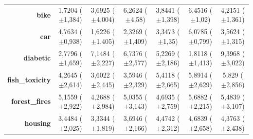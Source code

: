 \documentclass[preprint,review,12pt]{elsarticle}
\begin{document}
\begin{table}[!tb]
{\begin{tabular}{r|ccc|c|c|c|}
			\textbf{bike}                 & \cellcolor[rgb]{ .388,  .745,  .482}1,7204 ($\pm$1,384)                            & \cellcolor[rgb]{ .643,  .816,  .494}3,6925 ($\pm$4,004) & \cellcolor[rgb]{ .973,  .914,  .514}6,2624 ($\pm$4,58)  & \cellcolor[rgb]{ .663,  .824,  .498}3,8441 ($\pm$1,398) & \cellcolor[rgb]{ 1,  .922,  .518}6,4516 ($\pm$1,02)     & \cellcolor[rgb]{ .71,  .835,  .498}4,2151 ($\pm$1,361)  \\
			\textbf{car}                  & \cellcolor[rgb]{ .702,  .835,  .498}4,7634 ($\pm$0,938)                            & \cellcolor[rgb]{ .388,  .745,  .482}1,6226 ($\pm$1,405) & \cellcolor[rgb]{ .455,  .765,  .486}2,3269 ($\pm$1,409) & \cellcolor[rgb]{ .561,  .792,  .49}3,3473 ($\pm$1,35)   & \cellcolor[rgb]{ .831,  .871,  .506}6,0785 ($\pm$0,799) & \cellcolor[rgb]{ .58,  .8,  .49}3,5624 ($\pm$1,315)     \\
			\textbf{diabetic}             & \cellcolor[rgb]{ .506,  .776,  .486}2,7796 ($\pm$1,659)                            & \cellcolor[rgb]{ 1,  .886,  .514}7,1484 ($\pm$2,227)    & \cellcolor[rgb]{ 1,  .922,  .518}6,7376 ($\pm$2,577)    & \cellcolor[rgb]{ .812,  .867,  .506}5,2269 ($\pm$2,186) & \cellcolor[rgb]{ .388,  .745,  .482}1,8118 ($\pm$1,413) & \cellcolor[rgb]{ .988,  .69,  .475}9,3968 ($\pm$3,022)  \\
			\textbf{fish\_toxicity}       & \cellcolor[rgb]{ .533,  .784,  .49}4,2645 ($\pm$2,614)                             & \cellcolor[rgb]{ .388,  .745,  .482}3,6022 ($\pm$2,445) & \cellcolor[rgb]{ .388,  .745,  .482}3,5946 ($\pm$2,329) & \cellcolor[rgb]{ .784,  .859,  .502}5,4118 ($\pm$2,665) & \cellcolor[rgb]{ .89,  .89,  .51}5,8914 ($\pm$2,629)    & \cellcolor[rgb]{ .875,  .886,  .51}5,829 ($\pm$2,856)   \\
			\textbf{forest\_fires}        & \cellcolor[rgb]{ .769,  .855,  .502}5,1559 ($\pm$2,922)                            & \cellcolor[rgb]{ .388,  .745,  .482}4,2688 ($\pm$2,984) & \cellcolor[rgb]{ .718,  .839,  .498}5,0355 ($\pm$3,143) & \cellcolor[rgb]{ .569,  .796,  .49}4,6935 ($\pm$2,759)  & \cellcolor[rgb]{ 1,  .922,  .518}5,6882 ($\pm$2,215)    & \cellcolor[rgb]{ .91,  .894,  .51}5,4839 ($\pm$3,107)   \\
			\textbf{housing}              & \cellcolor[rgb]{ .404,  .749,  .482}3,4484 ($\pm$2,025)                            & \cellcolor[rgb]{ .388,  .745,  .482}3,3344 ($\pm$1,819) & \cellcolor[rgb]{ .439,  .757,  .482}3,6946 ($\pm$2,166) & \cellcolor[rgb]{ .553,  .792,  .49}4,4742 ($\pm$2,312)  & \cellcolor[rgb]{ .584,  .8,  .49}4,6839 ($\pm$2,658)    & \cellcolor[rgb]{ .537,  .788,  .49}4,3763 ($\pm$2,438)  \\

\end{tabular}}
\end{table}
\end{document}
